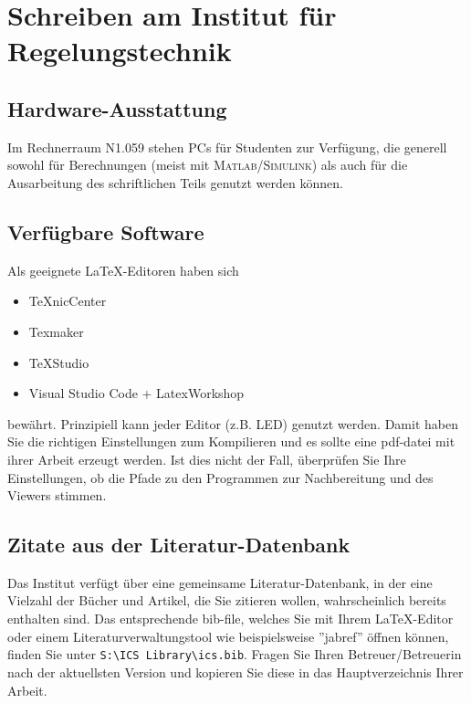 \section {Schreiben am Institut für Regelungstechnik}
\label{a:ab_rts_en}


\subsection{Hardware-Ausstattung}

Im Rechnerraum N1.059 stehen PCs für Studenten zur Verfügung, die
generell sowohl für Berechnungen (meist mit \textsc{Matlab}/\textsc{Simulink}) als
auch für die Ausarbeitung des schriftlichen Teils genutzt werden
können.


\subsection{Verfügbare Software}

Als geeignete \LaTeX-Editoren haben sich
\begin{itemize}
    \item TeXnicCenter
    \item Texmaker
    \item TeXStudio
    \item Visual Studio Code + LatexWorkshop
\end{itemize}

bewährt.
Prinzipiell kann jeder Editor (z.B. LED) genutzt werden.
Damit haben Sie die richtigen Einstellungen zum Kompilieren und es sollte eine pdf-datei mit ihrer Arbeit erzeugt werden.
Ist dies nicht der Fall, überprüfen Sie Ihre Einstellungen, ob die Pfade zu den Programmen zur Nachbereitung und des Viewers stimmen. 

\subsection{Zitate aus der Literatur-Datenbank}

Das Institut verfügt über eine gemeinsame
Literatur-Datenbank, in der eine Vielzahl der Bücher und Artikel,
die Sie zitieren wollen, wahrscheinlich bereits enthalten sind. 
Das entsprechende bib-file, welches Sie mit Ihrem \LaTeX-Editor oder einem
Literaturverwaltungstool wie beispielsweise ''jabref'' öffnen können, 
finden Sie unter \verb"S:\ICS Library\ics.bib". 
Fragen Sie Ihren Betreuer/Betreuerin nach der aktuellsten Version und kopieren Sie diese in das Hauptverzeichnis Ihrer Arbeit.

